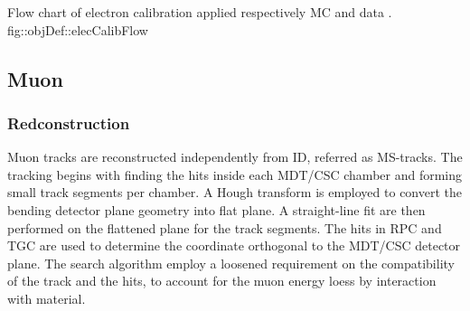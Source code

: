 
{Flow chart of electron calibration applied respectively MC and data \cite{161_egammaCalibRun1}.}
{fig::objDef::elecCalibFlow}




\subsection{Muon} \label{sec::objDef::muons}
\subsubsection{Redconstruction} \label{sec::objDef::muons::reco}
Muon tracks are reconstructed independently from ID, referred as MS-tracks. 
The tracking begins with finding the hits inside each MDT/CSC chamber and forming small track segments per chamber. 
A Hough transform is employed to convert the bending detector plane geometry into flat plane. A straight-line fit are then performed on the flattened plane for the track segments. 
The hits in RPC and TGC are used to determine the coordinate orthogonal to the MDT/CSC detector plane. The search algorithm employ a loosened requirement on the compatibility of the track and the hits, to account for the muon energy loess by interaction with material.\\

